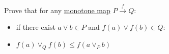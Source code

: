 Prove that for any \href{doc/1 math/Seven Sketches in Compositionality/Chapter 1: Generative Effects/4 Monotone maps/1 Monotone map}{monotone map} $P \xrightarrow{f} Q$:
    \begin{itemize}
      \item if there exist $a \lor b \in P$ and $f(a) \lor f(b) \in Q$:
      \item $f(a) \lor_Q f(b) \leq f(a \lor_P b)$
    \end{itemize}